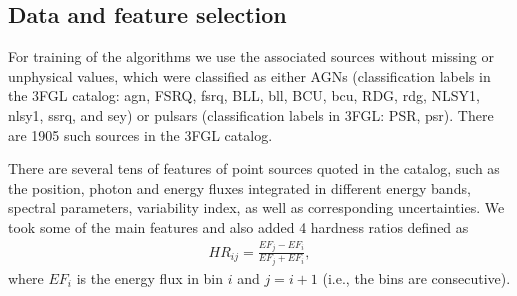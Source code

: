 \documentclass{aa}
\newcommand{\bea}{\begin{eqnarray}}
\newcommand{\eea}{\end{eqnarray}}
\newcommand{\lb}{\label}
\begin{document}
\subsection{Data and feature selection}

For training of the algorithms we use the associated sources without missing or unphysical values, 
which were classified as either AGNs (classification labels in the 3FGL catalog: agn, FSRQ, fsrq, BLL, bll, BCU, bcu, RDG, rdg, NLSY1, nlsy1, ssrq, and sey) or pulsars (classification labels in 3FGL: PSR, psr). 
There are 1905 such sources in the 3FGL catalog. 

There are several tens of features of point sources quoted in the catalog, such as the position, photon and energy fluxes integrated in different energy bands, spectral parameters, variability index, as well as corresponding uncertainties. 
We took some of the main features and also added 4 hardness ratios defined as 
\bea
\lb{eq:hr}
HR_{ij} = \frac{EF_j - EF_i}{EF_j + EF_i},
\eea
where $EF_i$ is the energy flux in bin $i$ and $j = i + 1$ (i.e., the bins are consecutive).
\end{document}

